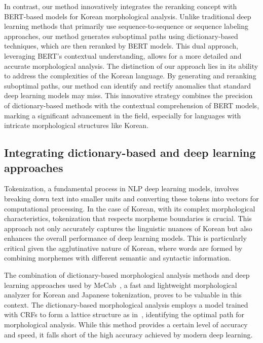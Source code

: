 \documentclass[AMS,STIX2COL]{WileyNJD-v2}
\begin{document}
    In contrast, our method innovatively integrates the reranking concept with BERT-based models for Korean morphological analysis.
    Unlike traditional deep learning methods that primarily use sequence-to-sequence or sequence labeling approaches, our method generates suboptimal paths using dictionary-based techniques, which are then reranked by BERT models.
    This dual approach, leveraging BERT's contextual understanding, allows for a more detailed and accurate morphological analysis.
    The distinction of our approach lies in its ability to address the complexities of the Korean language.
    By generating and reranking suboptimal paths, our method can identify and rectify anomalies that standard deep learning models may miss.
    This innovative strategy combines the precision of dictionary-based methods with the contextual comprehension of BERT models, marking a significant advancement in the field, especially for languages with intricate morphological structures like Korean.

    \subsection{Integrating dictionary-based and deep learning approaches}\label{subsec:integrating-dictionary-based-and-deep-learning-approaches}
    Tokenization, a fundamental process in NLP deep learning models, involves breaking down text into smaller units and converting these tokens into vectors for computational processing.
    In the case of Korean, with its complex morphological characteristics, tokenization that respects morpheme boundaries is crucial.
    This approach not only accurately captures the linguistic nuances of Korean but also enhances the overall performance of deep learning models.
    This is particularly critical given the agglutinative nature of Korean, where words are formed by combining morphemes with different semantic and syntactic information.

    The combination of dictionary-based morphological analysis methods and deep learning approaches used by MeCab~\cite{MeCab}, a fast and lightweight morphological analyzer for Korean and Japanese tokenization, proves to be valuable in this context.
    The dictionary-based morphological analysis employs a model trained with CRFs to form a lattice structure as in~\cite{Kudo2004, NaSH2014, NaSH2018}, identifying the optimal path for morphological analysis.
    While this method provides a certain level of accuracy and speed, it falls short of the high accuracy achieved by modern deep learning.
\end{document}
